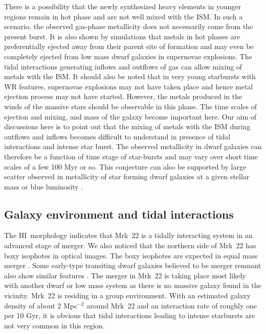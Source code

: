 \documentclass[useAMS,usenatbib]{mn2e}
\def\HI{H{\small{I}}~}
\begin{document}
There is a possibility that the newly synthesized heavy elements in younger regions remain in hot phase and are not well mixed with the ISM. In such a scenario, the observed gas-phase metallicity does not necessarily come from the present burst. It is also shown by simulations that metals in hot phases are preferentially ejected away from their parent site of formation and may even be completely ejected from low mass dwarf galaxies \citep{1999ApJ...513..142M} in supernovae explosions. The tidal interactions generating inflows and outflows of gas can allow mixing of metals with the ISM. It should also be noted that in very young starbursts with WR features, supernovae explosions may not have taken place and hence metal ejection process may not have started. However, the metals produced in the winds of the massive stars should be observable in this phase. The time scales of ejection and mixing, and mass of the galaxy become important here. Our aim of discussions here is to point out that the mixing of metals with the ISM during outflows and inflows becomes difficult to understand in presence of tidal interactions and intense star burst. The observed metallicity in dwarf galaxies can therefore be a function of time stage of star-bursts and may vary over short time scales of a few 100 Myr or so. This conjecture can also be supported by large scatter observed in metallicity of star forming dwarf galaxies at a given stellar mass or blue luminosity \citep{2004ApJS..153..243L, 2004A&A...428..425L, 2008A&A...491..131L, 2009A&A...508..615L, 2010MNRAS.401..759J, 2010A&A...517A..85L}.

\subsection{Galaxy environment and tidal interactions}

The \HI morphology indicates that Mrk~22 is a tidally interacting system in an advanced stage of merger. We also noticed that the northern side of Mrk~22 has boxy isophotes in optical images. The boxy isophotes are expected in equal mass merger \citep{1999ApJ...523L.133N}. Some early-type transiting dwarf galaxies believed to be merger remnant also show similar features \citep{2007ApJ...655L..29D}. The merger in Mrk~22 is taking place most likely with another dwarf or low mass system as there is no massive galaxy found in the vicinity. Mrk~22 is residing in a group environment. With an estimated galaxy density of about 2 Mpc$^{-2}$ around Mrk~22 and an interaction rate of roughly one per 10 Gyr, it is obvious that tidal interactions leading to intense starbursts are not very common in this region. 
\end{document}
